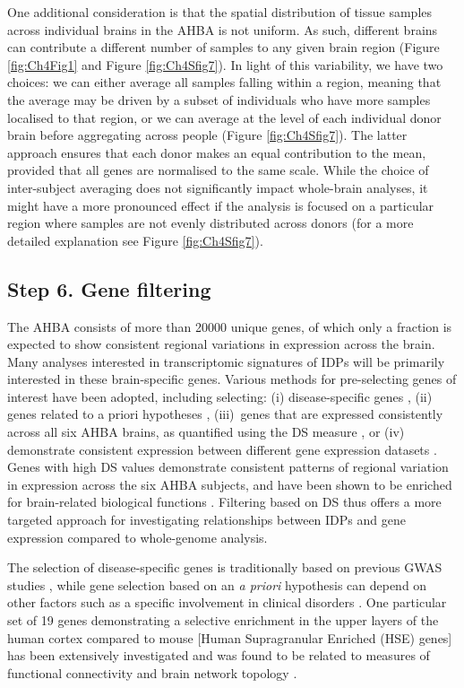 One additional consideration is that the spatial distribution of tissue samples across individual brains in the AHBA is not uniform. As such, different brains can contribute a different number of samples to any given brain region (Figure \ref{fig:Ch4Fig1} and Figure \ref{fig:Ch4Sfig7}). In light of this variability, we have two choices: we can either average all samples falling within a region, meaning that the average may be driven by a subset of individuals who have more samples localised to that region, or we can average at the level of each individual donor brain before aggregating across people (Figure \ref{fig:Ch4Sfig7}). The latter approach ensures that each donor makes an equal contribution to the mean, provided that all genes are normalised to the same scale. While the choice of inter-subject averaging does not significantly impact whole-brain analyses, it might have a more pronounced effect if the analysis is focused on a particular region where samples are not evenly distributed across donors (for a more detailed explanation see Figure \ref{fig:Ch4Sfig7}).

\subsection{Step 6. Gene filtering}

The AHBA consists of more than \num{20000} unique genes, of which only a fraction is expected to show consistent regional variations in expression across the brain. Many analyses interested in transcriptomic signatures of IDPs will be primarily interested in these brain-specific genes. Various methods for pre-selecting genes of interest have been adopted, including selecting: (i) disease-specific genes \citep{Rittman2016,Romme2017,Yokoyama2017a}, (ii) genes related to a priori hypotheses \mbox{\citep{Goyal2014,Komorowski2016,Krienen2016,Acevedo-Triana2017}}, \mbox{(iii) genes} that are expressed consistently across all six AHBA brains, as quantified using the DS measure \citep{Hawrylycz2015}, or (iv) demonstrate consistent expression between different gene expression datasets \citep{Shin2017}. Genes with high DS values demonstrate consistent patterns of regional variation in expression across the six AHBA subjects, and have been shown to be enriched for brain-related biological functions \citep{Hawrylycz2015}. Filtering based on DS thus offers a more targeted approach for investigating relationships between IDPs and gene expression compared to whole-genome analysis.

The selection of disease-specific genes is traditionally based on previous GWAS studies \citep{Satake2009,Simon-Sanchez2009,Hoglinger2011,Ferrari2014,Ripke2014a,Kouri2015}, while gene selection based on an \textit{a priori} hypothesis can depend on other factors such as a specific involvement in clinical disorders \citep{Komorowski2016,Acevedo-Triana2017}. One particular set of 19 genes demonstrating a selective enrichment in the upper layers of the human cortex compared to mouse [Human Supragranular Enriched (HSE) genes] has been extensively investigated and was found to be related to measures of functional connectivity \mbox{\citep{Krienen2016}} and brain network topology \citep{Vertes2016b,Romero-Garcia2018}.

